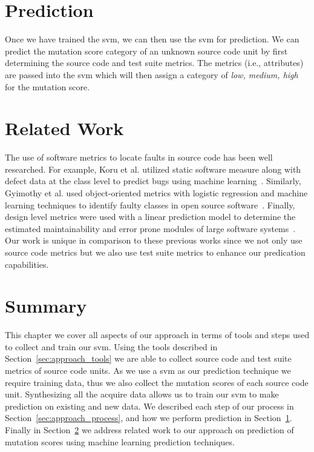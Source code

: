 \section{Prediction}
\label{sec:approach_prediction}
Once we have trained the \gls{svm}, we can then use the \gls{svm} for prediction. We can predict the mutation score category of an unknown source code unit by first determining the source code and test suite metrics. The metrics (i.e., attributes) are passed into the \gls{svm} which will then assign a category of \textit{low, medium, high} for the mutation score.


\section{Related Work}
\label{sec:approach_related_work}
The use of software metrics to locate faults in source code has been well researched. For example, Koru et al. utilized static software measure along with defect data at the class level to predict bugs using machine learning~\cite{KL05}. Similarly, Gyimothy et al. used object-oriented metrics with logistic regression and machine learning techniques to identify faulty classes in open source software~\cite{GFS05}. Finally, design level metrics were used with a linear prediction model to determine the estimated maintainability and error prone modules of large software systems~\cite{MKPS00}. Our work is unique in comparison to these previous works since we not only use source code metrics but we also use test suite metrics to enhance our predication capabilities.


\section{Summary}
\label{sec:approach_summary}
This chapter we cover all aspects of our approach in terms of tools and steps used to collect and train our \gls{svm}. Using the tools described in Section~\ref{sec:approach_tools} we are able to collect source code and test suite metrics of source code units. As we use a \gls{svm} as our prediction technique we require training data, thus we also collect the mutation scores of each source code unit. Synthesizing all the acquire data allows us to train our \gls{svm} to make prediction on existing and new data. We described each step of our process in Section~\ref{sec:approach_process}, and how we perform prediction in Section~\ref{sec:approach_prediction}. Finally in Section~\ref{sec:approach_related_work} we address related work to our approach on prediction of mutation scores using machine learning prediction techniques.
